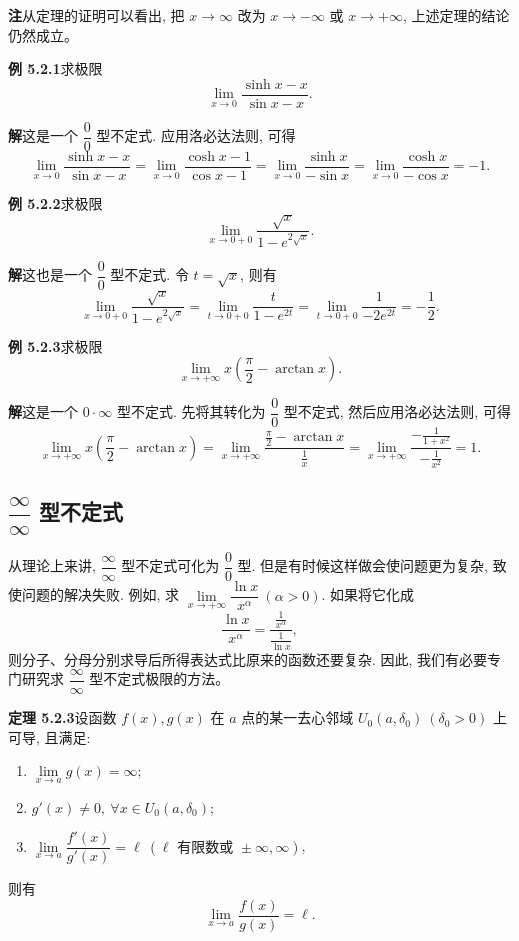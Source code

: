 \documentclass[UTF8, 12pt, fontset=fandol, oneside]{ctexart}
\begin{document}
\noindent\textbf{注}\quad 从定理的证明可以看出, 把 $x\to\infty$ 改为 $x\to-\infty$ 或 $x\to+\infty$, 上述定理的结论仍然成立。

\noindent\textbf{例 5.2.1}\quad 求极限
\[
  \lim_{x\to0}\frac{\sinh x-x}{\sin x-x}.
\]

\noindent\textbf{解}\quad 这是一个 $\dfrac00$ 型不定式. 应用洛必达法则, 可得
\[
  \lim_{x\to0}\frac{\sinh x-x}{\sin x-x}
  =
  \lim_{x\to0}\frac{\cosh x-1}{\cos x-1}
  =
  \lim_{x\to0}\frac{\sinh x}{-\sin x}
  =
  \lim_{x\to0}\frac{\cosh x}{-\cos x}
  =
  -1.
\]

\noindent\textbf{例 5.2.2}\quad 求极限
\[
  \lim_{x\to0+0}\frac{\sqrt{x}}{1-e^{2\sqrt{x}}}.
\]

\noindent\textbf{解}\quad 这也是一个 $\dfrac00$ 型不定式. 令 $t=\sqrt{x}$, 则有
\[
  \lim_{x\to0+0}\frac{\sqrt{x}}{1-e^{2\sqrt{x}}}
  =
  \lim_{t\to0+0}\frac{t}{1-e^{2t}}
  =
  \lim_{t\to0+0}\frac1{-2e^{2t}}
  =
  -\frac12.
\]

\noindent\textbf{例 5.2.3}\quad 求极限
\[
  \lim_{x\to+\infty}x\left(\frac\pi2-\arctan x\right).
\]

\noindent\textbf{解}\quad 这是一个 $0\cdot\infty$ 型不定式. 先将其转化为 $\dfrac00$ 型不定式, 然后应用洛必达法则, 可得
\[
  \lim_{x\to+\infty}x\left(\frac\pi2-\arctan x\right)
  =
  \lim_{x\to+\infty}
  \frac{\frac\pi2-\arctan x}{\frac1x}
  =
  \lim_{x\to+\infty}
  \frac{-\frac1{1+x^2}}{-\frac1{x^2}}
  =
  1.
\]

\subsection{$\dfrac\infty\infty$ 型不定式}

从理论上来讲, $\dfrac\infty\infty$ 型不定式可化为 $\dfrac00$ 型. 但是有时候这样做会使问题更为复杂, 致使问题的解决失败. 例如, 求 $\lim\limits_{x\to+\infty}\dfrac{\ln x}{x^\alpha}\ (\alpha>0)$. 如果将它化成
\[
  \frac{\ln x}{x^\alpha}
  =
  \frac{\frac1{x^\alpha}}{\frac1{\ln x}},
\]
则分子、分母分别求导后所得表达式比原来的函数还要复杂. 因此, 我们有必要专门研究求 $\dfrac\infty\infty$ 型不定式极限的方法。

\noindent\textbf{定理 5.2.3}\quad 设函数 $f(x),g(x)$ 在 $a$ 点的某一去心邻域 $U_0(a,\delta_0)\ (\delta_0>0)$ 上可导, 且满足:
\begin{enumerate}
  \item $\lim\limits_{x\to a}g(x)=\infty$;
  \item $g'(x)\ne0,\ \forall x\in U_0(a,\delta_0)$;
  \item $\lim\limits_{x\to a}\dfrac{f'(x)}{g'(x)}=\ell\ (\ell\text{ 有限数或 }\pm\infty,\infty)$,
\end{enumerate}
则有
\[
  \lim_{x\to a}\frac{f(x)}{g(x)}=\ell.
\]
\end{document}
